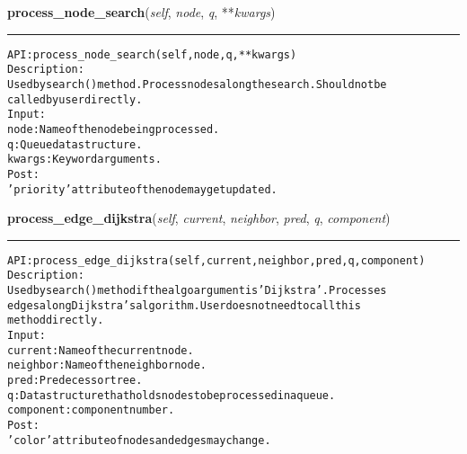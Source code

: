     \label{coinor:gimpy:graph:Graph:process_node_search}

    \vspace{0.5ex}

\hspace{.8\funcindent}\begin{boxedminipage}{\funcwidth}

    \raggedright \textbf{process\_node\_search}(\textit{self}, \textit{node}, \textit{q}, **\textit{kwargs})

    \vspace{-1.5ex}

    \rule{\textwidth}{0.5\fboxrule}
\setlength{\parskip}{2ex}
\begin{alltt}

API: process\_node\_search(self, node, q, **kwargs)
Description:
Used by search() method. Process nodes along the search. Should not be
called by user directly.
Input:
    node: Name of the node being processed.
    q: Queue data structure.
    kwargs: Keyword arguments.
Post:
    'priority' attribute of the node may get updated.
\end{alltt}

\setlength{\parskip}{1ex}
    \end{boxedminipage}

    \label{coinor:gimpy:graph:Graph:process_edge_dijkstra}

    \vspace{0.5ex}

\hspace{.8\funcindent}\begin{boxedminipage}{\funcwidth}

    \raggedright \textbf{process\_edge\_dijkstra}(\textit{self}, \textit{current}, \textit{neighbor}, \textit{pred}, \textit{q}, \textit{component})

    \vspace{-1.5ex}

    \rule{\textwidth}{0.5\fboxrule}
\setlength{\parskip}{2ex}
\begin{alltt}

API: process\_edge\_dijkstra(self, current, neighbor, pred, q, component)
Description:
Used by search() method if the algo argument is 'Dijkstra'. Processes
edges along Dijkstra's algorithm. User does not need to call this
method directly.
Input:
    current: Name of the current node.
    neighbor: Name of the neighbor node.
    pred: Predecessor tree.
    q: Data structure that holds nodes to be processed in a queue.
    component: component number.
Post:
    'color' attribute of nodes and edges may change.
\end{alltt}

\setlength{\parskip}{1ex}
    \end{boxedminipage}

